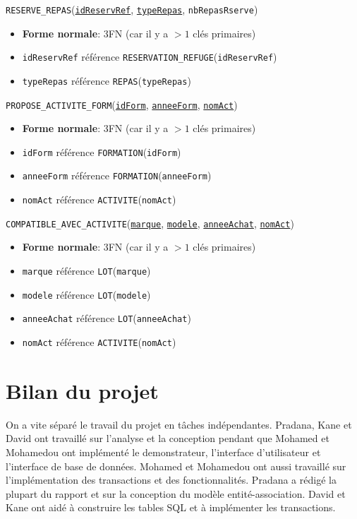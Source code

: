 \documentclass[12pt, a4paper]{article}
\newcommand\att[1]{\textnhtt{#1}}
\begin{document}
\att{RESERVE\_REPAS}(\att{\underline{idReservRef}}, \att{\underline{typeRepas}}, \att{nbRepasRserve})
\begin{itemize}
\item \textbf{Forme normale}: 3FN (car il y a $>1$ clés primaires)
\item \att{idReservRef} référence \att{RESERVATION\_REFUGE}(\att{idReservRef})
\item \att{typeRepas} référence \att{REPAS}(\att{typeRepas})
\end{itemize}

\att{PROPOSE\_ACTIVITE\_FORM}(\att{\underline{idForm}}, \att{\underline{anneeForm}}, \att{\underline{nomAct}})
\begin{itemize}
\item \textbf{Forme normale}: 3FN (car il y a $>1$ clés primaires)
\item \att{idForm} référence \att{FORMATION}(\att{idForm})
\item \att{anneeForm} référence \att{FORMATION}(\att{anneeForm})
\item \att{nomAct} référence \att{ACTIVITE}(\att{nomAct})
\end{itemize}

\att{COMPATIBLE\_AVEC\_ACTIVITE}(\att{\underline{marque}}, \att{\underline{modele}}, \att{\underline{anneeAchat}}, \att{\underline{nomAct}})
\begin{itemize}
\item \textbf{Forme normale}: 3FN (car il y a $>1$ clés primaires)
\item \att{marque} référence \att{LOT}(\att{marque})
\item \att{modele} référence \att{LOT}(\att{modele})
\item \att{anneeAchat} référence \att{LOT}(\att{anneeAchat})
\item \att{nomAct} référence \att{ACTIVITE}(\att{nomAct})
\end{itemize}


\section{Bilan du projet}
On a vite séparé le travail du projet en tâches indépendantes.
Pradana, Kane et David ont travaillé sur l'analyse et la conception pendant que Mohamed et Mohamedou ont implémenté le demonstrateur, l'interface d'utilisateur et l'interface de base de données.
Mohamed et Mohamedou ont aussi travaillé sur l'implémentation des transactions et des fonctionnalités.
Pradana a rédigé la plupart du rapport et sur la conception du modèle entité-association.
David et Kane ont aidé à construire les tables SQL et à implémenter les transactions. 

\end{document}
